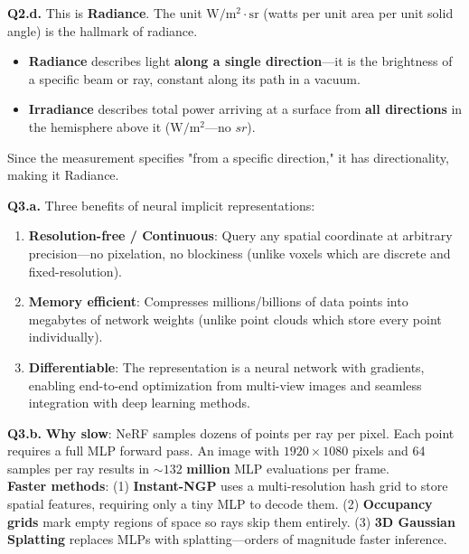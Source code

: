 \documentclass[11pt]{article}
\begin{document}
\vspace{0.75em}
\textbf{Q2.d.} This is \textbf{Radiance}. The unit $\mathrm{W/m^2\!\cdot\!sr}$ (watts per unit area per unit solid angle) is the hallmark of radiance.
\begin{itemize}[leftmargin=2em, nosep]
\item \textbf{Radiance} describes light \textbf{along a single direction}—it is the brightness of a specific beam or ray, constant along its path in a vacuum.
\item \textbf{Irradiance} describes total power arriving at a surface from \textbf{all directions} in the hemisphere above it ($\mathrm{W/m^2}$—no $sr$).
\end{itemize}
Since the measurement specifies "from a specific direction," it has directionality, making it Radiance.

\vspace{1em}

\textbf{Q3.a.} Three benefits of neural implicit representations:
\begin{enumerate}[leftmargin=2em, nosep]
\item \textbf{Resolution-free / Continuous}: Query any spatial coordinate at arbitrary precision—no pixelation, no blockiness (unlike voxels which are discrete and fixed-resolution).
\item \textbf{Memory efficient}: Compresses millions/billions of data points into megabytes of network weights (unlike point clouds which store every point individually).
\item \textbf{Differentiable}: The representation is a neural network with gradients, enabling end-to-end optimization from multi-view images and seamless integration with deep learning methods.
\end{enumerate}

\vspace{0.75em}
\textbf{Q3.b.} \textbf{Why slow}: NeRF samples dozens of points per ray per pixel. Each point requires a full MLP forward pass. An image with $1920\times 1080$ pixels and 64 samples per ray results in $\sim\!132$ \textbf{million} MLP evaluations per frame.
\\
\textbf{Faster methods}: (1) \textbf{Instant-NGP} uses a multi-resolution hash grid to store spatial features, requiring only a tiny MLP to decode them. (2) \textbf{Occupancy grids} mark empty regions of space so rays skip them entirely. (3) \textbf{3D Gaussian Splatting} replaces MLPs with splatting—orders of magnitude faster inference.
\end{document}
